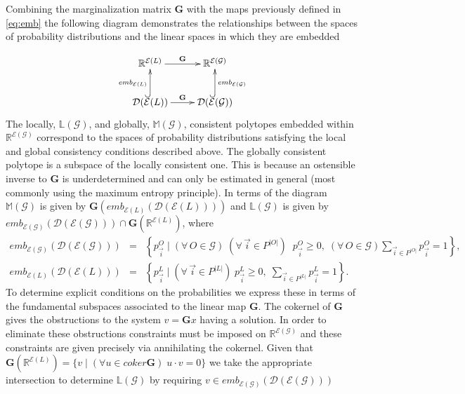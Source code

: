 Combining the marginalization matrix $\mathbf{G}$ with the maps previously defined in \ref{eq:emb} the following diagram demonstrates the relationships between the spaces of probability distributions and the linear spaces in which they are embedded

\begin{equation*}
\xymatrix{
 \mathbb{R}^{\mathcal{E}(L)} \ar[r]^{\mathbf{G}} &
   \mathbb{R}^{\mathcal{E}(\mathcal{G})} \\
 \dist (\mathcal{E}(L)) \ar[r]^{\mathbf{G}} \ar@{^{(}->}[u]^{emb_{\mathcal{E}(L)}}& \ar@{^{(}->}[u]_{emb_{\mathcal{E}(\mathcal{G})}}
  \dist (\mathcal{E}(\mathcal{G}))
  }
\end{equation*}
The locally, $\mathbb{L}(\mathcal{G})$, and globally, $\mathbb{M}(\mathcal{G})$, consistent polytopes embedded within $\mathbb{R}^{\mathcal{E}(\mathcal{G})}$ correspond to the spaces of probability distributions satisfying the local and global consistency conditions described above. The globally consistent polytope is a subspace of the locally consistent one. This is because an ostensible inverse to $\mathbf{G}$ is underdetermined and can only be estimated in general (most commonly using the maximum entropy principle). In terms of the diagram $\mathbb{M}(\mathcal{G})$ is given by $\mathbf{G}(emb_{\mathcal{E}(L)}(\mathcal{D}(\mathcal{E}(L))))$ and $\mathbb{L}(\mathcal{G})$ is given by $emb_{\mathcal{E}(\mathcal{G})}(\mathcal{D}(\mathcal{E}(\mathcal{G}))) \cap \mathbf{G}(\mathbb{R}^{\mathcal{E}(L)})$, where
\begin{eqnarray}
emb_{\mathcal{E}(\mathcal{G})}(\mathcal{D}(\mathcal{E}(\mathcal{G}))) &=& \left\{ p^{O}_{\vec{i}} \; \bigg| \; (\forall\, O \in \mathcal{G}) \; (\forall\, \vec{i} \in P^{|O|}) \;\; p^O_{\vec{i}} \geq 0, \; (\forall\, O \in \mathcal{G}) \sum_{\vec{i} \in P^{|O|}} p^{O}_{\vec{i}} = 1 \right\},\\
emb_{\mathcal{E}(L)}(\mathcal{D}(\mathcal{E}(L))) &=& \left\{ p^L_{\vec{i}} \; \bigg| \; (\forall\, \vec{i} \in P^{|L|}) \; p^L_{\vec{i}} \geq 0, \; \sum_{\vec{i} \in P^{|L|}} p^L_{\vec{i}} = 1 \right\}.
\end{eqnarray}
To determine explicit conditions on the probabilities we express these in terms of the fundamental subspaces associated to the linear map $\mathbf{G}$. The cokernel of $\mathbf{G}$ gives the obstructions to the system $v=\mathbf{G}x$ having a solution. In order to eliminate these obstructions constraints must be imposed on $\mathbb{R}^{\mathcal{E}(\mathcal{G})}$ and these constraints are given precisely via annihilating the cokernel. Given that $\mathbf{G}(\mathbb{R}^{\mathcal{E}(L)}) = \{ v \; | \; (\forall u \in coker \mathbf{G}) \; u \cdot v = 0\}$ we take the appropriate intersection to determine $\mathbb{L}(\mathcal{G})$ by requiring $v \in emb_{\mathcal{E}(\mathcal{G})}(\mathcal{D}(\mathcal{E}(\mathcal{G})))$
